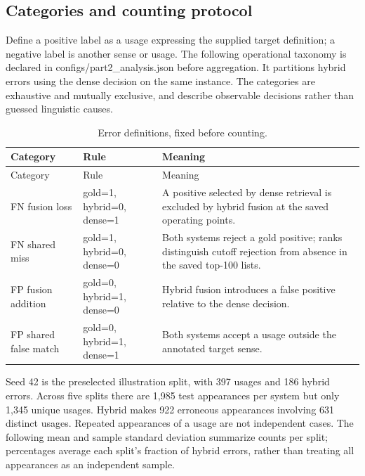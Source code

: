 \subsection{Categories and counting protocol}
Define a positive label as a usage expressing the supplied target definition; a negative label is another sense or usage. The following operational taxonomy is declared in configs/part2\_analysis.json before aggregation. It partitions hybrid errors using the dense decision on the same instance. The categories are exhaustive and mutually exclusive, and describe observable decisions rather than guessed linguistic causes.

{\small
\setlength{\tabcolsep}{3pt}
\begin{longtable}{>{\raggedright\arraybackslash}p{}>{\raggedright\arraybackslash}p{}>{\raggedright\arraybackslash}p{}}
\caption{Error definitions, fixed before counting.}\\
\toprule
Category & Rule & Meaning \\
\midrule
\endfirsthead
Category & Rule & Meaning \\
\midrule
\endhead
FN fusion loss & gold=1, hybrid=0, dense=1 & A positive selected by dense retrieval is excluded by hybrid fusion at the saved operating points. \\
FN shared miss & gold=1, hybrid=0, dense=0 & Both systems reject a gold positive; ranks distinguish cutoff rejection from absence in the saved top-100 lists. \\
FP fusion addition & gold=0, hybrid=1, dense=0 & Hybrid fusion introduces a false positive relative to the dense decision. \\
FP shared false match & gold=0, hybrid=1, dense=1 & Both systems accept a usage outside the annotated target sense. \\
\bottomrule
\end{longtable}
}

Seed 42 is the preselected illustration split, with 397 usages and 186 hybrid errors. Across five splits there are 1,985 test appearances per system but only 1,345 unique usages. Hybrid makes 922 erroneous appearances involving 631 distinct usages. Repeated appearances of a usage are not independent cases. The following mean and sample standard deviation summarize counts per split; percentages average each split's fraction of hybrid errors, rather than treating all appearances as an independent sample.

